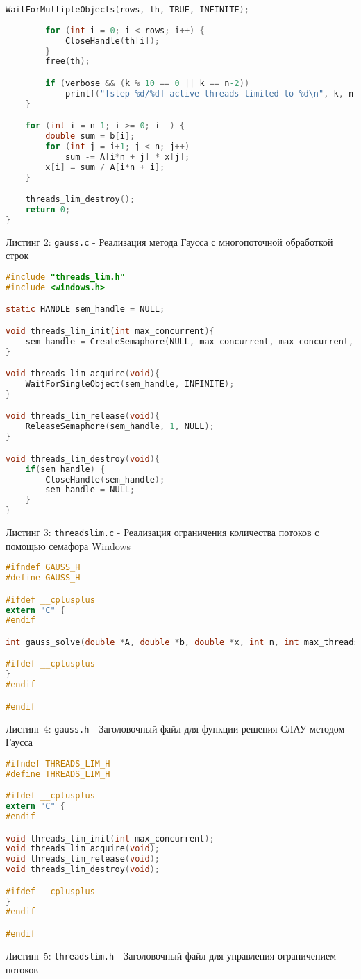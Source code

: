 \begin{lstlisting}[language=C]
        WaitForMultipleObjects(rows, th, TRUE, INFINITE);
        
        for (int i = 0; i < rows; i++) {
            CloseHandle(th[i]);
        }
        free(th);

        if (verbose && (k % 10 == 0 || k == n-2))
            printf("[step %d/%d] active threads limited to %d\n", k, n, max_threads);
    }

    for (int i = n-1; i >= 0; i--) {
        double sum = b[i];
        for (int j = i+1; j < n; j++)
            sum -= A[i*n + j] * x[j];
        x[i] = sum / A[i*n + i];
    }

    threads_lim_destroy();
    return 0;
}
\end{lstlisting}
Листинг 2: \texttt{gauss.c} - Реализация метода Гаусса с многопоточной обработкой строк

\begin{lstlisting}[language=C]
#include "threads_lim.h"
#include <windows.h>

static HANDLE sem_handle = NULL;

void threads_lim_init(int max_concurrent){
    sem_handle = CreateSemaphore(NULL, max_concurrent, max_concurrent, NULL);
}

void threads_lim_acquire(void){
    WaitForSingleObject(sem_handle, INFINITE);
}

void threads_lim_release(void){
    ReleaseSemaphore(sem_handle, 1, NULL);
}

void threads_lim_destroy(void){
    if(sem_handle) {
        CloseHandle(sem_handle);
        sem_handle = NULL;
    }
}
\end{lstlisting}
Листинг 3: \texttt{threads\textunderscore lim.c} - Реализация ограничения количества потоков с помощью семафора Windows

\begin{lstlisting}[language=C]
#ifndef GAUSS_H
#define GAUSS_H

#ifdef __cplusplus
extern "C" {
#endif

int gauss_solve(double *A, double *b, double *x, int n, int max_threads, int verbose);

#ifdef __cplusplus
}
#endif

#endif
\end{lstlisting}
Листинг 4: \texttt{gauss.h} - Заголовочный файл для функции решения СЛАУ методом Гаусса

\begin{lstlisting}[language=C]
#ifndef THREADS_LIM_H
#define THREADS_LIM_H

#ifdef __cplusplus
extern "C" {
#endif

void threads_lim_init(int max_concurrent);
void threads_lim_acquire(void);
void threads_lim_release(void);
void threads_lim_destroy(void);

#ifdef __cplusplus
}
#endif

#endif
\end{lstlisting}
Листинг 5: \texttt{threads\textunderscore lim.h} - Заголовочный файл для управления ограничением потоков

